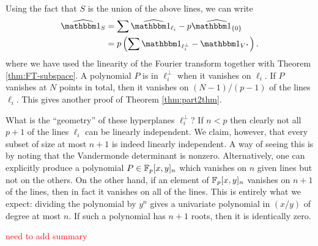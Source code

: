 Using the fact that $S$ is the union of the above lines, we can write
\begin{align*}
	\widehat{\IND_S} &= \sum \widehat{\IND_{\ell_i}} - p\widehat{\IND_{\{0\}}} \\
	&= p\left(\sum \IND_{\ell_i^\bot} - \IND_{V^*}\right).
\end{align*}
where we have used the linearity of the Fourier transform together with Theorem \ref{thm:FT-subspace}. A polynomial $P$ is in $\ell_i^\bot$ when it vanishes on $\ell_i$. If $P$ vanishes at $N$ points in total, then it vanishes on $(N - 1)/(p-1)$ of the lines $\ell_i$. This gives another proof of Theorem \ref{thm:part2thm}.

What is the ``geometry'' of these hyperplanes $\ell_i^\bot$? If $n < p$ then clearly not all $p+1$ of the lines $\ell_i$ can be linearly independent. We claim, however, that every subset of size at most $n+1$ is indeed linearly independent. A way of seeing this is by noting that the Vandermonde determinant is nonzero. Alternatively, one can explicitly produce a polynomial $P \in \mathbb{F}_p[x,y]_n$ which vanishes on $n$ given lines but not on the others. On the other hand, if an element of $\mathbb{F}_p[x,y]_n$ vanishes on $n+1$ of the lines, then in fact it vanishes on all of the lines. This is entirely what we expect: dividing the polynomial by $y^n$ gives a univariate polynomial in $(x/y)$ of degree at most $n$. If such a polynomial has $n+1$ roots, then it is identically zero.

\textcolor{red}{need to add summary}